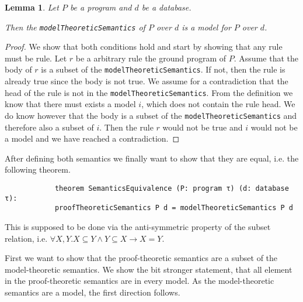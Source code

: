 \documentclass{article}
\newtheorem{lemma}{Lemma}
\begin{document}
        \begin{lemma}
            Let $P$ be a program and $d$ be a database. 
            
            Then the \texttt{modelTheoreticSemantics} of $P$ over $d$ is a model for $P$ over $d$.
        \end{lemma}
        \begin{proof}
            We show that both conditions hold and start by showing that any rule must be rule. Let $r$ be a arbitrary rule the ground program of $P$. Assume that the body of $r$ is a subset of the \texttt{modelTheoreticSemantics}. If not, then the rule is already true since the body is not true.
            We assume for a contradiction that the head of the rule is not in the \texttt{modelTheoreticSemantics}. From the definition we know that there must exists a model $i$, which does not contain the rule head. We do know however that the body is a subset of the \texttt{modelTheoreticSemantics} and therefore also a subset of $i$. Then the rule $r$ would not be true and $i$ would not be a model and we have reached a contradiction.
        \end{proof}

        After defining both semantics we finally want to show that they are equal, i.e. the following theorem.

        \begin{lstlisting}
            theorem SemanticsEquivalence (P: program τ) (d: database τ): 
            proofTheoreticSemantics P d = modelTheoreticSemantics P d 
        \end{lstlisting}

        This is supposed to be done via the anti-symmetric property of the subset relation, i.e. $\forall X,Y. X \subseteq Y \land Y \subseteq X \rightarrow X = Y$.

        First we want to show that the proof-theoretic semantics are a subset of the model-theoretic semantics. We show the bit stronger statement, that all element in the proof-theoretic semantics are in every model. As the model-theoretic semantics are a model, the first direction follows.
\end{document}
